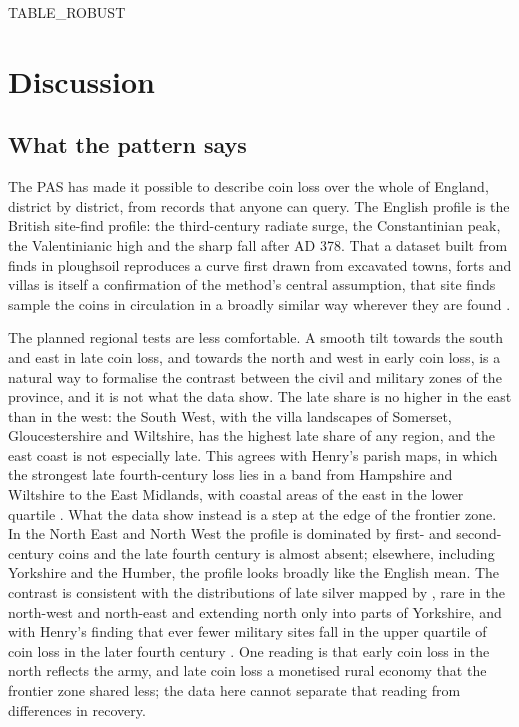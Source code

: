 \documentclass[11pt,a4paper]{article}
\begin{document}
{{TABLE_ROBUST}}

\section{Discussion}\label{sec:disc}
\subsection{What the pattern says}
The PAS has made it possible to describe coin loss over the whole of England, district by district, from records that anyone can query. The English profile is the British site-find profile: the third-century radiate surge, the Constantinian peak, the Valentinianic high and the sharp fall after AD 378. That a dataset built from finds in ploughsoil reproduces a curve first drawn from excavated towns, forts and villas is itself a confirmation of the method's central assumption, that site finds sample the coins in circulation in a broadly similar way wherever they are found \citep{reece1995,walton2012}.

The planned regional tests are less comfortable. A smooth tilt towards the south and east in late coin loss, and towards the north and west in early coin loss, is a natural way to formalise the contrast between the civil and military zones of the province, and it is not what the data show. The late share is no higher in the east than in the west: the South West, with the villa landscapes of Somerset, Gloucestershire and Wiltshire, has the highest late share of any region, and the east coast is not especially late. This agrees with Henry's parish maps, in which the strongest late fourth-century loss lies in a band from Hampshire and Wiltshire to the East Midlands, with coastal areas of the east in the lower quartile \citep{henry2024}. What the data show instead is a step at the edge of the frontier zone. In the North East and North West the profile is dominated by first- and second-century coins and the late fourth century is almost absent; elsewhere, including Yorkshire and the Humber, the profile looks broadly like the English mean. The contrast is consistent with the distributions of late silver mapped by \citet{walton2016}, rare in the north-west and north-east and extending north only into parts of Yorkshire, and with Henry's finding that ever fewer military sites fall in the upper quartile of coin loss in the later fourth century \citep{henry2024}. One reading is that early coin loss in the north reflects the army, and late coin loss a monetised rural economy that the frontier zone shared less; the data here cannot separate that reading from differences in recovery.
\end{document}
